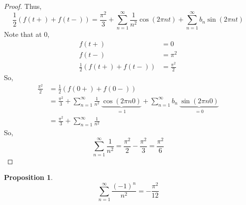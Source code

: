 \documentclass[12pt, reqno]{amsart}
\newtheorem{prop}{Proposition}[section]
\theoremstyle{definition}
\theoremstyle{remark}
\begin{document}
\begin{itemize}
\begin{proof}
        Thus, $$\frac{1}{2}(f(t+)+f(t-))= \frac{\pi^{2}}{3}+\sum_{n=1}^{\infty} \frac{1}{n^{2}}\cos(2\pi nt)+\sum_{n=1}^{\infty}b_{n}\sin(2\pi nt)$$
        Note that at $0$, \begin{align*}
        f(t+)&= 0\\
        f(t-)&= \pi^{2}\\
        \frac{1}{2}(f(t+)+f(t-))&= \frac{\pi^{2}}{2}
        \end{align*}
        So, \begin{align*}
        \frac{\pi^{2}}{2}&= \frac{1}{2}(f(0+)+f(0-))\\
        &= \frac{\pi^{2}}{3}+\sum_{n=1}^{\infty} \frac{1}{n^{2}}\ \underbrace{\cos(2\pi n0)}_{=1}+\sum_{n=1}^{\infty}b_{n}\ \underbrace{\sin(2\pi n0)}_{=0}\\
        &= \frac{\pi^{2}}{3}+\sum_{n=1}^{\infty} \frac{1}{n^{2}}
        \end{align*}So, $$\sum_{n=1}^{\infty} \frac{1}{n^{2}}= \frac{\pi^{2}}{2}- \frac{\pi^{2}}{3}= \frac{\pi^{2}}{6}$$

\end{proof}


\begin{prop}

\begin{equation}
\sum_{n=1}^\infty \dfrac{(-1)^n}{n^2}=-\frac{\pi^2}{12}
\end{equation}
\end{prop}


\end{itemize}
\end{document}
